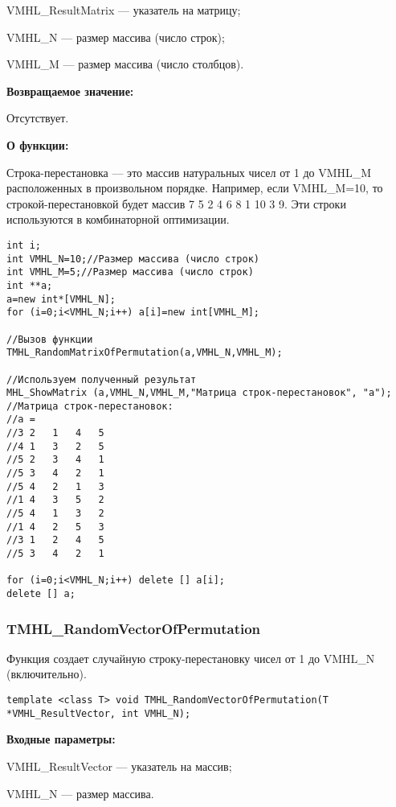\documentclass[a4paper,12pt]{article}
\begin{document}
 VMHL\_ResultMatrix --- указатель на матрицу;
 
 VMHL\_N --- размер массива (число строк);
 
 VMHL\_M --- размер массива (число столбцов).

\textbf{Возвращаемое значение:} 

Отсутствует.

\textbf{О функции:}

Строка-перестановка --- это массив натуральных чисел от 1 до VMHL\_M расположенных в произвольном порядке. Например, если VMHL\_M=10, то строкой-перестановкой будет массив 7 5 2 4 6 8 1 10 3 9. Эти строки используются в комбинаторной оптимизации.



\begin{lstlisting}[label=code_use_TMHL_RandomMatrixOfPermutation,caption=Пример использования]
int i;
int VMHL_N=10;//Размер массива (число строк)
int VMHL_M=5;//Размер массива (число строк)
int **a;
a=new int*[VMHL_N];
for (i=0;i<VMHL_N;i++) a[i]=new int[VMHL_M];

//Вызов функции
TMHL_RandomMatrixOfPermutation(a,VMHL_N,VMHL_M);

//Используем полученный результат
MHL_ShowMatrix (a,VMHL_N,VMHL_M,"Матрица строк-перестановок", "a");
//Матрица строк-перестановок:
//a =
//3	2	1	4	5
//4	1	3	2	5
//5	2	3	4	1
//5	3	4	2	1
//5	4	2	1	3
//1	4	3	5	2
//5	4	1	3	2
//1	4	2	5	3
//3	1	2	4	5
//5	3	4	2	1

for (i=0;i<VMHL_N;i++) delete [] a[i];
delete [] a;
\end{lstlisting}

\subsubsection{TMHL\_RandomVectorOfPermutation}\label{TMHL_RandomVectorOfPermutation}

Функция создает случайную строку-перестановку чисел от 1 до VMHL\_N (включительно).


\begin{lstlisting}[label=code_syntax_TMHL_RandomVectorOfPermutation,caption=Синтаксис]
template <class T> void TMHL_RandomVectorOfPermutation(T *VMHL_ResultVector, int VMHL_N);
\end{lstlisting}

\textbf{Входные параметры:}
 
VMHL\_ResultVector --- указатель на массив;
 
VMHL\_N --- размер массива.
\end{document}
